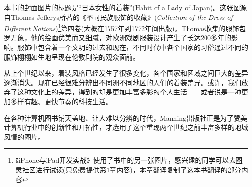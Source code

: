 
本书的封面图片的标题是“日本女性的着装”(Habit of a Lady of Japan)。这张图源自Thomas Jefferys所著的《不同民族服饰的收藏》(\textit{Collection of the Dress of Different Nations})\footnote[1]{《iPhone与iPad开发实战》使用了书中的另一张图片，感兴趣的同学可以去\href{http://www.ituring.com.cn/article/39923}{图灵社区}进行试读(只免费提供第1章内容)，本章翻译复制了这本书翻译的部分内容}第四卷(大概在1757年到1772年间出版)。Thomas收集的服饰包罗万象，他的绘画优美而又细腻，对欧洲戏剧服装设计产生了长达200多年的影响。服饰中包含着一个文明的过去和现在，不同时代中各个国家的习俗通过不同的服饰栩栩如生地呈现在伦敦剧院的观众面前。

从上个世纪以来，着装风格已经发生了很多变化，各个国家和区域之间巨大的差异逐渐消失。现在已经很难分辨出不同洲不同地区的人们的着装差异。或许，我们放弃了这种文化上的差异，得到的却是更加丰富多彩的个人生活——或者说是一种更加多样有趣、更快节奏的科技生活。

在各种计算机图书铺天盖地、让人难以分辨的时代，Manning出版社正是为了赞美计算机行业中的创新性和开拓性，才选用了这个重现两个世纪之前丰富多样的地域风情的图片。


